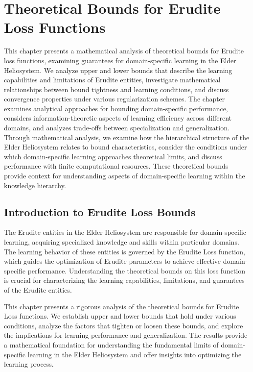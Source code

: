 \chapter{Theoretical Bounds for Erudite Loss Functions}

\begin{tcolorbox}[colback=PureBlue!5!white,colframe=PureBlue!75!black,title=Chapter Summary]
This chapter presents a mathematical analysis of theoretical bounds for Erudite loss functions, examining guarantees for domain-specific learning in the Elder Heliosystem. We analyze upper and lower bounds that describe the learning capabilities and limitations of Erudite entities, investigate mathematical relationships between bound tightness and learning conditions, and discuss convergence properties under various regularization schemes. The chapter examines analytical approaches for bounding domain-specific performance, considers information-theoretic aspects of learning efficiency across different domains, and analyzes trade-offs between specialization and generalization. Through mathematical analysis, we examine how the hierarchical structure of the Elder Heliosystem relates to bound characteristics, consider the conditions under which domain-specific learning approaches theoretical limits, and discuss performance with finite computational resources. These theoretical bounds provide context for understanding aspects of domain-specific learning within the knowledge hierarchy.
\end{tcolorbox}

\section{Introduction to Erudite Loss Bounds}

The Erudite entities in the Elder Heliosystem are responsible for domain-specific learning, acquiring specialized knowledge and skills within particular domains. The learning behavior of these entities is governed by the Erudite Loss function, which guides the optimization of Erudite parameters to achieve effective domain-specific performance. Understanding the theoretical bounds on this loss function is crucial for characterizing the learning capabilities, limitations, and guarantees of the Erudite entities.

This chapter presents a rigorous analysis of the theoretical bounds for Erudite Loss functions. We establish upper and lower bounds that hold under various conditions, analyze the factors that tighten or loosen these bounds, and explore the implications for learning performance and generalization. The results provide a mathematical foundation for understanding the fundamental limits of domain-specific learning in the Elder Heliosystem and offer insights into optimizing the learning process.

